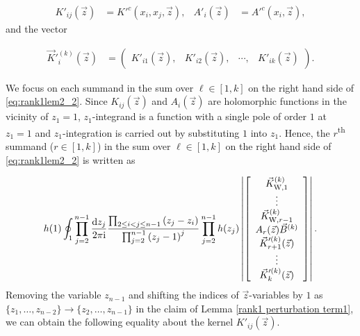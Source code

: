 \documentclass[cmp]{svjour}
\numberwithin{theorem}{section}
\numberwithin{equation}{section}
\def\dd{{\rm d}}
\def\ii{{\rm i}}
\begin{document}
\begin{align*}
K'_{ij}(\vec{z}) & = K'^c(x_i , x_j, \vec{z}),  &   A'_i(\vec{z}) & = A'^c(x_i, \vec{z}) ,
\end{align*}
and the vector

\begin{align*}
\vec{K}'^{(k)}_{i}(\vec{z}) &= \left(
\begin{array}{cccc}
K'_{i1}(\vec{z}), & K'_{i2}(\vec{z}), & \cdots , & K'_{ik}(\vec{z})
\end{array}
\right).
\end{align*}

We focus on each summand in the sum over $\ell \in [1,k]$ on the right hand side of \eqref{eq:rank1lem2_2}.
Since $K_{ij}(\vec{z})$ and $A_i(\vec{z})$ are holomorphic functions in the vicinity of $z_1 = 1$, $z_1$-integrand is a function with a single pole of order $1$ at $z_1 = 1$ and $z_1$-integration is carried out by substituting $1$ into $z_1$.
Hence, the $r$\textsuperscript{th} summand ($r \in [1,k]$) in the sum over $\ell \in [1,k]$ on the right hand side of \eqref{eq:rank1lem2_2} is written as

\begin{equation}
\label{eq:rank1lem2_3}
\begin{split}
h(1) \oint_{1} \prod_{j=2}^{n-1}{ \frac{\dd z_j}{2 \pi \ii} } \frac{ \prod_{2 \leq i < j \leq n-1}{(z_j - z_i)} }{ \prod_{j=2}^{n-1}{{(z_j -1)}^{j}} } \prod_{j=2}^{n-1}{h(z_j)} 
\left|
\left[
\begin{array}{c}
\vec{K}^{(k)}_{\mathrm{W}, 1}  \\
\vdots \\
\vec{K}^{(k)}_{\mathrm{W}, r -1} \\
 A_r (\vec{z}) \vec{B}^{(k)} \\
\vec{K}'^{(k)}_{r +1}(\vec{z})  \\
\vdots \\
\vec{K}'^{(k)}_{k}(\vec{z})
\end{array}
\right]
\right| .
\end{split}
\end{equation}
Removing the variable $z_{n-1}$ and shifting the indices of $\Vec{z}$-variables by $1$ as $\{ z_1,\ldots,z_{n-2} \} \to \{ z_2,\ldots,z_{n-1} \}$ in the claim of Lemma \ref{rank1 perturbation term1}, we can obtain the following equality about the kernel $K'_{ij}(\vec{z})$.
\end{document}
